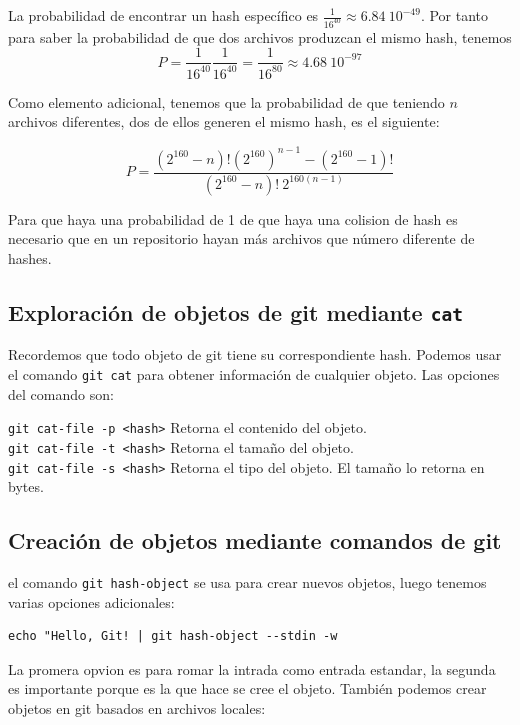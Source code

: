  La probabilidad de encontrar un hash específico es $\frac{1}{16^{40}} \approx 6.84 \ 10^{-49}$. Por tanto para saber la probabilidad de que dos archivos produzcan el mismo hash, tenemos \\

 \begin{equation*}
 P = \frac{1}{16^{40}}  \frac{1}{16^{40}} = \frac{1}{16^{80}} \approx 4.68 \ 10^{-97}
 \end{equation*}

Como elemento adicional, tenemos que la probabilidad de que teniendo $n$ archivos diferentes, dos de ellos generen el mismo hash, es el siguiente:

\begin{equation*}
P = \frac{(2^{160}-n)!(2^{160})^{n-1} - (2^{160} - 1)! }{ (2^{160}- n)! \ 2^{160(n-1)} }
\end{equation*}

Para que haya una probabilidad de 1 de que haya una colision de hash es necesario que en un repositorio hayan más archivos que número diferente de hashes. 

\subsection{Exploración de objetos de git mediante \texttt{cat}}

Recordemos que todo objeto de git tiene su correspondiente hash. Podemos usar el comando \texttt{git cat} para obtener información de cualquier objeto. Las opciones del comando son: 

\texttt{git cat-file -p <hash>} Retorna el contenido del objeto. \\
\texttt{git cat-file -t <hash>} Retorna el tamaño del objeto. \\
\texttt{git cat-file -s <hash>} Retorna el tipo del objeto. El tamaño lo retorna en bytes. \\

\subsection{Creación de objetos mediante comandos de git}

el comando \texttt{git hash-object} se usa para crear nuevos objetos, luego tenemos varias opciones adicionales:
\begin{verbatim}
echo "Hello, Git! | git hash-object --stdin -w
\end{verbatim}

La promera opvion es para romar la intrada como entrada estandar, la segunda es importante porque es la que hace se cree el objeto. También podemos crear objetos en git basados en archivos locales:

